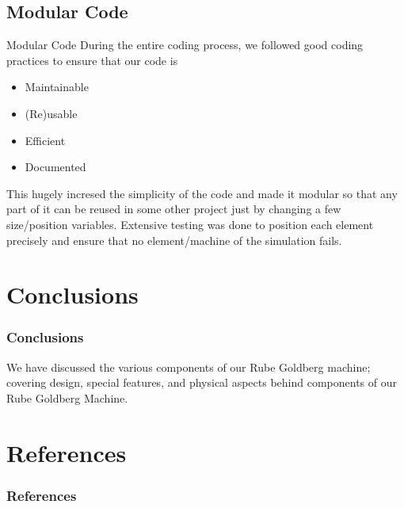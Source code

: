 \subsection{Modular Code}
\begin{frame}{Modular Code}
During the entire coding process, we followed good coding practices to ensure that our code is
\begin{itemize}
\item Maintainable
\item (Re)usable
\item Efficient
\item Documented
\end{itemize}
This hugely incresed the simplicity of the code and made it modular so that any part of it can be reused in some other project just by changing a few size/position variables. Extensive testing was done to position each element precisely and ensure that no element/machine of the simulation fails.
\end{frame}

\section{Conclusions}
\begin{frame}
	\frametitle{Conclusions}
We have discussed the various components of our Rube Goldberg machine; covering design, special features, and physical aspects behind components of our Rube Goldberg Machine.
\end{frame}

\section{References}
\begin{frame}
	\frametitle{References}
	
	{}
	\cite{wiki:001} 
	\cite{wiki:002} 
	\cite{wiki:000} 
	\cite{website:coll}
	\cite{website:bod}
	\cite{website:fix}
	\cite{website:user}
	\cite{wiki:000} 
  \cite{website:you}
	\cite{website:git}
\end{frame}
